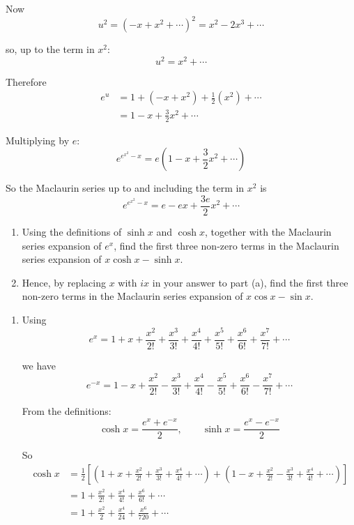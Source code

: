 \documentclass[leqno]{article}
\begin{document}
\begin{enumerate}[
  label=\textbf{\arabic*.},
  leftmargin=*,
  topsep=0pt,
  partopsep=0pt,
  parsep=0pt
]
\begin{djsSolution}
Now
\[
u^2=(-x+x^2+\cdots)^2=x^2-2x^3+\cdots
\]

so, up to the term in \(x^2\):
\[
u^2=x^2+\cdots
\]

Therefore
\begin{align*}
e^u&=1+\left(-x+x^2\right)+\frac{1}{2}\left(x^2\right)+\cdots\\
&=1-x+\frac{3}{2}x^2+\cdots
\end{align*}

Multiplying by \(e\):
\[
e^{e^{x^2}-x}=e\left(1-x+\frac{3}{2}x^2+\cdots\right)
\]

So the Maclaurin series up to and including the term in \(x^2\) is
\[
e^{e^{x^2}-x}=e-ex+\frac{3e}{2}x^2+\cdots
\]
\end{djsSolution}


\newpage

\questionitem

\begin{enumerate}[label=\textbf{(\alph*)}]
  \item Using the definitions of $\sinh x$ and $\cosh x$, together with the Maclaurin series expansion of $e^x$, find the first three non-zero terms in the Maclaurin series expansion of $x\cosh x-\sinh x$.  \\
  \item Hence, by replacing $x$ with $ix$ in your answer to part (a), find the first three non-zero terms in the Maclaurin series expansion of $x\cos x-\sin x$.  \\
\end{enumerate}

\vspace*{10pt}

\begin{djsSolution}
\begin{enumerate}[label=\textbf{(\alph*)}]
  \item Using
  \[
  e^x=1+x+\frac{x^2}{2!}+\frac{x^3}{3!}+\frac{x^4}{4!}+\frac{x^5}{5!}+\frac{x^6}{6!}+\frac{x^7}{7!}+\cdots
  \]

  we have
  \[
  e^{-x}=1-x+\frac{x^2}{2!}-\frac{x^3}{3!}+\frac{x^4}{4!}-\frac{x^5}{5!}+\frac{x^6}{6!}-\frac{x^7}{7!}+\cdots
  \]

  From the definitions:
  \[
  \cosh x=\frac{e^x+e^{-x}}{2},\qquad \sinh x=\frac{e^x-e^{-x}}{2}
  \]

  So
  \begin{align*}
  \cosh x
  &=\frac{1}{2}\left[\left(1+x+\frac{x^2}{2!}+\frac{x^3}{3!}+\frac{x^4}{4!}+\cdots\right)
  +\left(1-x+\frac{x^2}{2!}-\frac{x^3}{3!}+\frac{x^4}{4!}+\cdots\right)\right] \\
  &=1+\frac{x^2}{2!}+\frac{x^4}{4!}+\frac{x^6}{6!}+\cdots \\
  &=1+\frac{x^2}{2}+\frac{x^4}{24}+\frac{x^6}{720}+\cdots
  \end{align*}


\end{enumerate}
\end{djsSolution}
\end{enumerate}
\end{document}
